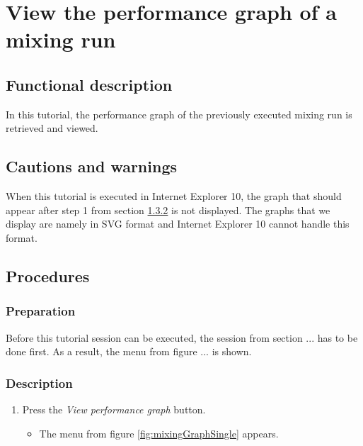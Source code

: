 \section{View the performance graph of a mixing run}\label{sec:viewsinglegraph}

\subsection{Functional description}
In this tutorial, the performance graph of the previously executed mixing run is retrieved and viewed.

\subsection{Cautions and warnings}
When this tutorial is executed in Internet Explorer 10, the graph that should appear after step 1 from section  \ref{subsubsec:viewsinglegraphDesc} is not displayed. The graphs that we display are namely in SVG format and Internet Explorer 10 cannot handle this format.

\subsection{Procedures}

\subsubsection{Preparation}
Before this tutorial session can be executed, the session from section ... has to be done first. As a result, the menu from figure ... is shown.

\subsubsection{Description}\label{subsubsec:viewsinglegraphDesc}
\begin{enumerate}
	\item Press the \emph{View performance graph} button.
		\begin{itemize}
			\item The menu from figure \ref{fig:mixingGraphSingle} appears.
		\end{itemize}	
\end{enumerate}



